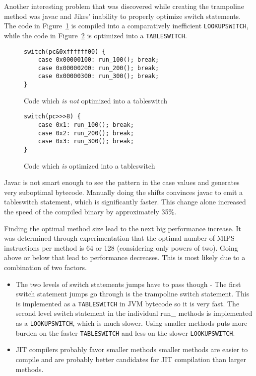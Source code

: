 \documentclass{acmconf}
\begin{document}
Another interesting problem that was discovered while creating the
trampoline method was javac and Jikes' inability to properly optimize
switch statements.  The code in Figure~\ref{lookupswitch} is compiled
into a comparatively inefficient {\tt LOOKUPSWITCH}, while the code in
Figure~\ref{tableswitch} is optimized into a {\tt TABLESWITCH}.

\begin{figure}
{\footnotesize\begin{verbatim}
switch(pc&0xffffff00) {
    case 0x00000100: run_100(); break;
    case 0x00000200: run_200(); break;
    case 0x00000300: run_300(); break;
}
\end{verbatim}}
\caption{\label{lookupswitch} Code which {\it is not} optimized into a tableswitch}
\end{figure}

\begin{figure}
{\footnotesize\begin{verbatim}
switch(pc>>>8) {
    case 0x1: run_100(); break;
    case 0x2: run_200(); break;
    case 0x3: run_300(); break;
}
\end{verbatim}}
\caption{\label{tableswitch} Code which {\it is} optimized into a tableswitch}
\end{figure}

Javac is not smart enough to see the pattern in the case values and
generates very suboptimal bytecode. Manually doing the shifts
convinces javac to emit a tableswitch statement, which is
significantly faster. This change alone increased the speed of
the compiled binary by approximately 35\%.

Finding the optimal method size lead to the next big performance
increase.  It was determined through experimentation that the optimal
number of MIPS instructions per method is 64 or 128 (considering only 
powers of two). Going above or below that lead to performance
decreases. This is most likely due to a combination of two factors.

\begin{itemize}

\item The two levels of switch statements jumps have to pass though -
      The first switch statement jumps go through is the trampoline
      switch statement. This is implemented as a {\tt TABLESWITCH} in JVM
      bytecode so it is very fast. The second level switch statement
      in the individual run\_ methods is implemented as a
      {\tt LOOKUPSWITCH}, which is much slower. Using smaller methods puts
      more burden on the faster {\tt TABLESWITCH} and less on the slower
      {\tt LOOKUPSWITCH}.

\item JIT compilers probably favor smaller methods smaller methods are
      easier to compile and are probably better candidates for JIT
      compilation than larger methods.

\end{itemize}
\end{document}
